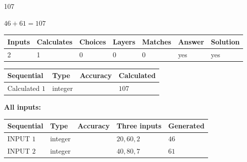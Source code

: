 \documentclass[12pt]{article}
\begin{document}
 

107
 
 
\noindent{}
 
 

 
 
 
\noindent{}
 
 

$ %
46 +  %
61=   %
107$
 
 
\noindent{}
 
 

 
   
   
   
   
\noindent\begin{tabular}{|l|l|l|l|l|l|l|}
 \hline
Inputs & Calculates & Choices & Layers & Matches & Answer & Solution \\ \hline
 2  & 
 1  & 
 0
  & 
 0  & 
 0  & 
  yes & 
  yes 
  \\ \hline
 \end{tabular}
   
   
   
   
\noindent{}
   
   
  
  
\noindent\begin{tabular}{|l|l|l|l|}
\hline
 Sequential & Type & Accuracy & Calculated \\ 
\hline
 
 
  Calculated $  1 $ & integer &  & 
  $ 107 $ 
 \\  \hline  
 \end{tabular}
   
   
   
   
\noindent\vspace{0.1in}\hspace{-0.08in} {\textbf{\Large{All inputs: }}}
   
   
  
  
\noindent\begin{tabular}{|l|l|l|l|l|}
\hline
 Sequential & Type & Accuracy & Three inputs & Generated \\ 
\hline
 
 
  INPUT $  1 $ & integer &  & $
 20
 , 
 60
 , 
 2
 $ & $ 46 $ 
 \\  \hline  
 
 
  INPUT $  2 $ & integer &  & $
 40
 , 
 80
 , 
 7
 $ & $ 61 $ 
 \\  \hline  
 \end{tabular}
   
\end{document}
